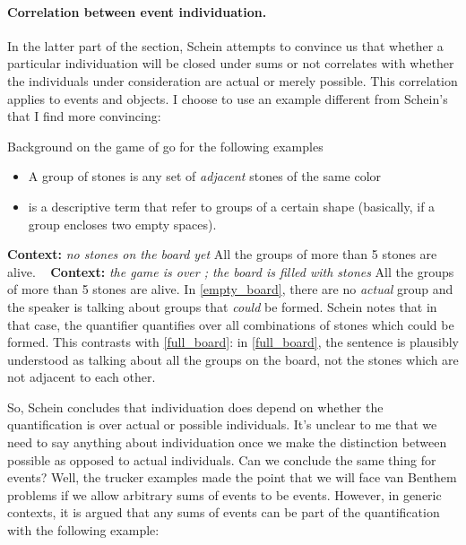 \paragraph{Correlation between event individuation.} In the latter part of the section, Schein attempts to convince us that whether a particular individuation will be closed under sums or not correlates with whether the individuals under consideration are actual or merely possible. This correlation applies to events and objects. I choose to use an example different from Schein's that I find more convincing:

\begin{boxy}{Background on the game of go for the following examples}\\
\begin{itemize}
\item A group of stones is any set of \emph{adjacent} stones of the same color
\item {} is a descriptive term that refer to groups of a certain shape (basically, if a group encloses two empty spaces).
\end{itemize}
\end{boxy}

\pex\label{empty_board}
 \a \textbf{Context:}\emph{ no stones on the board yet}
 \a All the groups of more than 5 stones are alive.
 \xe
\pex~ \label{full_board}
\a \textbf{Context:} \emph{the game is over ; the board is filled with stones}
\a All the groups of more than 5 stones are alive.
\xe
%
In \cref{empty_board}, there are no \emph{actual} group and the speaker is talking about groups that \emph{could} be formed. Schein notes that in that case, the quantifier quantifies over all combinations of stones which could be formed. This contrasts with \cref{full_board}: in \cref{full_board}, the sentence is plausibly understood as talking about all the groups on the board, not the stones which are not adjacent to each other.

So, Schein concludes that individuation does depend on whether the quantification is over actual or possible individuals. It's unclear to me that we need to say anything about individuation once we make the distinction between possible as opposed to actual individuals. 
 Can we conclude the same thing for events? Well, the trucker examples made the point that we will face van Benthem problems if we allow arbitrary sums of events to be events. However, in generic contexts, it is argued that any sums of events can be part of the quantification with the following example:

